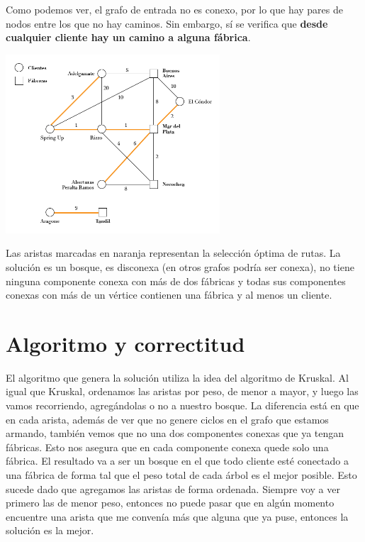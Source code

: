 \documentclass[a4paper]{report}
\begin{document}
Como podemos ver, el grafo de entrada no es conexo, por lo que hay pares de nodos entre los que no hay caminos. Sin embargo, sí se verifica que \textbf{desde cualquier cliente hay un camino a alguna fábrica}.

\begin{center}
    \includegraphics[width=0.6\textwidth]{elcondor-02.png}
\end{center}

Las aristas marcadas en naranja representan la selección óptima de rutas. La solución es un bosque, es disconexa (en otros grafos podría ser conexa), no tiene ninguna componente conexa con más de dos fábricas y todas sus componentes conexas con más de un vértice contienen una fábrica y al menos un cliente.

\section{Algoritmo y correctitud}

El algoritmo que genera la solución utiliza la idea del algoritmo de Kruskal. Al igual que Kruskal, ordenamos las aristas por peso, de menor a mayor, y luego las vamos recorriendo, agregándolas o no a nuestro bosque. La diferencia está en que en cada arista, además de ver que no genere ciclos en el grafo que estamos armando, también vemos que no una dos componentes conexas que ya tengan fábricas.
Esto nos asegura que en cada componente conexa quede solo una fábrica. El resultado va a ser un bosque en el que todo cliente esté conectado a una fábrica de forma tal que el peso total de cada árbol es el mejor posible. Esto sucede dado que agregamos las aristas de forma ordenada. Siempre voy a ver primero las de menor peso, entonces no puede pasar que en algún momento encuentre una arista que me convenía más que alguna que ya puse, entonces la solución es la mejor.
\end{document}
